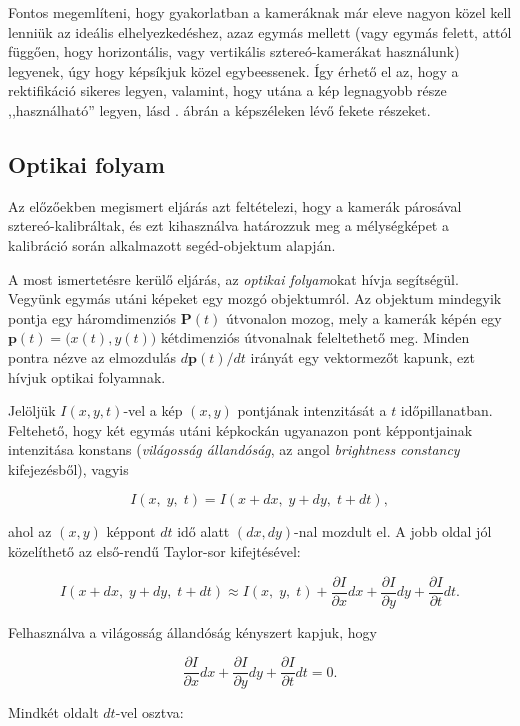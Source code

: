 Fontos megemlíteni, hogy gyakorlatban a kameráknak már eleve nagyon közel kell lenniük az ideális elhelyezkedéshez, azaz egymás mellett (vagy egymás felett, attól függően, hogy horizontális, vagy vertikális sztereó-kamerákat használunk) legyenek, úgy hogy képsíkjuk közel egybeessenek. Így érhető el az, hogy a rektifikáció sikeres legyen, valamint, hogy utána a kép legnagyobb része ,,használható'' legyen, lásd . ábrán a képszéleken lévő fekete részeket.

\subsection{Optikai folyam \label{methods:optic}}

Az előzőekben megismert eljárás azt feltételezi, hogy a kamerák párosával sztereó-kalib\-ráltak, és ezt kihasználva határozzuk meg a mélységképet a kalibráció során alkalmazott segéd-objek\-tum alapján.

A most ismertetésre kerülő eljárás, az \textit{optikai folyam}okat \cite{optic-flow} hívja segítségül. Vegyünk egymás utáni képeket egy mozgó objektumról. Az objektum mindegyik pontja egy háromdimenziós $\mathbf{P}(t)$ útvonalon mozog, mely a kamerák képén egy $\mathbf{p}(t) = \big(x(t), y(t)\big)$ kétdimenziós útvonalnak feleltethető meg. Minden pontra nézve az elmozdulás $d\mathbf{p}(t) / dt$ irányát egy vektormezőt kapunk, ezt hívjuk optikai folyamnak.

Jelöljük $I(x, y, t)$-vel a kép $(x, y)$ pontjának intenzitását a $t$ időpillanatban. Feltehető, hogy két egymás utáni képkockán ugyanazon pont képpontjainak intenzitása konstans (\textit{világosság állandóság}, az angol \textit{brightness constancy} kifejezésből), vagyis

\[I(x,\; y,\; t) = I(x+dx,\; y+dy,\; t+dt),\]

ahol az $(x,y)$ képpont $dt$ idő alatt $(dx,dy)$-nal mozdult el. A jobb oldal jól közelíthető az első-rendű Taylor-sor kifejtésével:

\[I(x+dx,\; y+dy,\; t+dt) \approx I(x,\; y,\; t) + \frac{\partial I}{\partial x} dx + \frac{\partial I}{\partial y} dy + \frac{\partial I}{\partial t} dt.\]

Felhasználva a világosság állandóság kényszert kapjuk, hogy

\[\frac{\partial I}{\partial x} dx + \frac{\partial I}{\partial y} dy + \frac{\partial I}{\partial t} dt = 0.\]

Mindkét oldalt $dt$-vel osztva:

